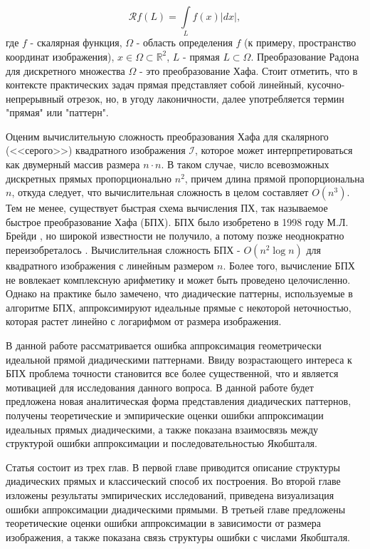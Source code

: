 \begin{equation}\label{eq:radon}
	\mathcal{R}f(L) = \int\limits_{L} f(x) |dx|,
\end{equation}
где $f$ - скалярная функция, $\Omega$ - область определения $f$ (к примеру, пространство координат изображения), $x \in \Omega \subset \mathbb{R}^2$, $L$ - прямая $L \subset \Omega$. 
Преобразование Радона для дискретного множества $\Omega$ - это преобразование Хафа. 
Стоит отметить, что в контексте практических задач прямая представляет собой линейный, кусочно-непрерывный отрезок, но, в угоду лаконичности, далее употребляется термин "прямая" или "паттерн".

Оценим вычислительную сложность преобразования Хафа для скалярного (<<серого>>) квадратного изображения $\mathcal{I}$, которое может интерпретироваться как двумерный массив размера $n \cdot n$. 
В таком случае, число всевозможных дискретных прямых пропорционально $n^2$, причем длина прямой пропорциональна $n$, откуда следует, что вычислительная сложность в целом составляет $O(n^3)$. 
Тем не менее, существует быстрая схема вычисления ПХ, так называемое быстрое преобразование Хафа (БПХ). 
БПХ было изобретено в 1998 году М.Л. Брейди \cite{Brady1998}, но широкой известности не получило, а потому позже неоднократно переизобреталось \cite{NiksKarp2004rus, Fred2005}. 
Вычислительная сложность БПХ -  $O(n^2 \log{n})$ для квадратного изображения с линейным размером $n$. 
Более того, вычисление БПХ не вовлекает комплексную арифметику и может быть проведено целочисленно. 
Однако на практике было замечено, что диадические паттерны, используемые в алгоритме БПХ, аппроксимируют идеальные прямые с некоторой неточностью, которая растет линейно с логарифмом от размера изображения.

В данной работе рассматривается ошибка аппроксимация геометрически идеальной прямой диадическими паттернами. 
Ввиду возрастающего интереса к БПХ проблема точности становится все более существенной, что и является мотивацией для исследования данного вопроса. 
В данной работе будет предложена новая аналитическая форма представления диадических паттернов, получены теоретические и эмпирические оценки ошибки аппроксимации идеальных прямых диадическими, а также показана взаимосвязь между структурой ошибки аппроксимации и последовательностью Якобшталя.

Статья состоит из трех глав. 
В первой главе приводится описание структуры диадических прямых и классический способ их построения. 
Во второй главе изложены результаты эмпирических исследований, приведена визуализация ошибки аппроксимации диадическими прямыми. 
В третьей главе предложены теоретические оценки ошибки аппроксимации в зависимости от размера изображения, а также показана связь структуры ошибки с числами Якобшталя.
